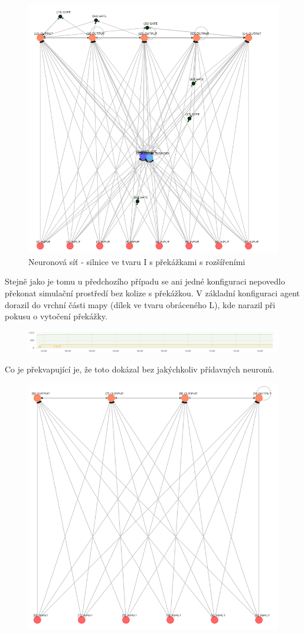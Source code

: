 \begin{figure}[H]
	\centering
	\includegraphics[width=0.7\linewidth]{solutions/IWithObstructions/advanced}
	\caption{Neuronová síť - silnice ve tvaru I s překážkami s rozšířeními}
	\label{fig:advanced}
\end{figure}

Stejně jako je tomu u předchozího případu se ani jedné konfiguraci nepovedlo překonat simulační prostředí bez kolize s překážkou.
V základní konfiguraci agent dorazil do vrchní části mapy (dílek ve tvaru obráceného L), kde narazil při pokusu o vytočení překážky.
\begin{figure}[H]
	\centering
	\includegraphics[width=0.5\linewidth]{solutions/Iadvanced/basicGraph}
	\caption{}
	\label{fig:basicgraph}
\end{figure}
Co je překvapující je, že toto dokázal bez jakýchkoliv přídavných neuronů.

\begin{figure}
	\centering
	\includegraphics[width=0.5\linewidth]{solutions/Iadvanced/basic}
	\caption{}
	\label{fig:basic}
\end{figure}


